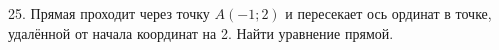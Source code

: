 25. Прямая проходит через точку $A(-1;2)$ и пересекает ось ординат в точке, удалённой от начала координат на 2. Найти уравнение прямой.\\

